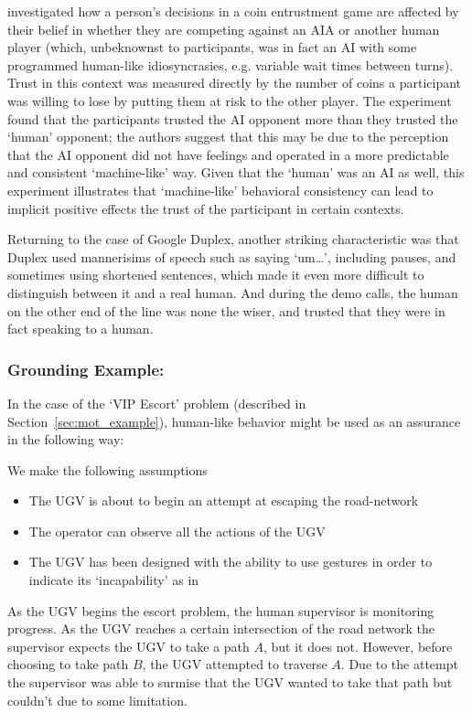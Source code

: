 \citet{Wu2016-ei} investigated how a person's decisions in a coin entrustment game are affected by their belief in whether they are competing against an AIA or another human player (which, unbeknownst to participants, was in fact an AI with some programmed human-like idiosyncrasies, e.g. variable wait times between turns). Trust in this context was measured directly by the number of coins a participant was willing to lose by putting them at risk to the other player. The experiment found that the participants trusted the AI opponent more than they trusted the `human' opponent; the authors suggest that this may be due to the perception that the AI opponent did not have feelings and operated in a more predictable and consistent `machine-like' way. Given that the `human' was an AI as well, this experiment illustrates that `machine-like' behavioral consistency can lead to implicit positive effects the trust of the participant in certain contexts.

Returning to the case of Google Duplex, another striking characteristic was that Duplex used mannerisims of speech such as saying `um\ldots', including pauses, and sometimes using shortened sentences, which made it even more difficult to distinguish between it and a real human. And during the demo calls, the human on the other end of the line was none the wiser, and trusted that they were in fact speaking to a human.

\subsubsection{Grounding Example:}
In the case of the `VIP Escort' problem (described in Section~\ref{sec:mot_example}), human-like behavior might be used as an assurance in the following way:

We make the following assumptions

\begin{itemize}
    \item The UGV is about to begin an attempt at escaping the road-network
    \item The operator can observe all the actions of the UGV
    \item The UGV has been designed with the ability to use gestures in order to indicate its `incapability' as in \cite{Kwon2018-xt}
\end{itemize}

As the UGV begins the escort problem, the human supervisor is monitoring progress. As the UGV reaches a certain intersection of the road network the supervisor expects the UGV to take a path $A$, but it does not. However, before choosing to take path $B$, the UGV attempted to traverse $A$. Due to the attempt the supervisor was able to surmise that the UGV wanted to take that path but couldn't due to some limitation. 

